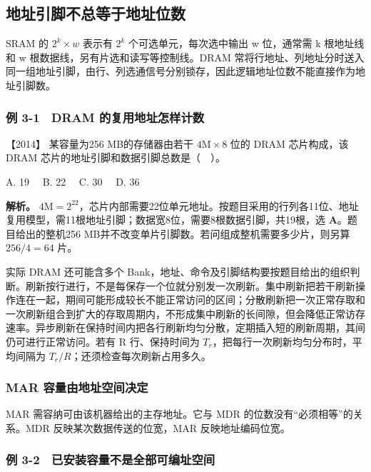 \subsection{地址引脚不总等于地址位数}\label{co-03-03}

SRAM 的 \(2^k\times w\) 表示有 \(2^k\) 个可选单元，每次选中输出 w 位，通常需 k 根地址线和 w 根数据线，另有片选和读写等控制线。DRAM 常将行地址、列地址分时送入同一组地址引脚，由行、列选通信号分别锁存，因此逻辑地址位数不能直接作为地址引脚数。

\subsubsection{例 3-1　DRAM 的复用地址怎样计数}\label{co-ex3-1}

\noindent{}【2014】 某容量为256 MB的存储器由若干 \(4\mathrm M\times8\) 位的 DRAM 芯片构成，该 DRAM 芯片的地址引脚和数据引脚总数是（　）。

A. 19　 B. 22　 C. 30　 D. 36


\textbf{解析。} \(4\mathrm M=2^{22}\)，芯片内部需要22位单元地址。按题目采用的行列各11位、地址复用模型，需11根地址引脚；数据宽8位，需要8根数据引脚，共19根，选 \textbf{A}。题目给出的整机256 MB并不改变单片引脚数。若问组成整机需要多少片，则另算 \(256/4=64\) 片。

实际 DRAM 还可能含多个 Bank，地址、命令及引脚结构要按题目给出的组织判断。刷新按行进行，不是每保存一个位就分别发一次刷新。集中刷新把若干刷新操作连在一起，期间可能形成较长不能正常访问的区间；分散刷新把一次正常存取和一次刷新组合到扩大的存取周期内，不形成集中刷新的长间隙，但会降低正常访存速率。异步刷新在保持时间内把各行刷新均匀分散，定期插入短的刷新周期，其间仍可进行正常访问。若有 R 行、保持时间为 \(T_r\)，把每行一次刷新均匀分布时，平均间隔为 \(T_r/R\)；还须检查每次刷新占用多久。

\subsubsection{MAR 容量由地址空间决定}\label{mar-ux5bb9ux91cfux7531ux5730ux5740ux7a7aux95f4ux51b3ux5b9a}

MAR 需容纳可由该机器给出的主存地址。它与 MDR 的位数没有``必须相等''的关系。MDR 反映某次数据传送的位宽，MAR 反映地址编码位宽。

\subsubsection{例 3-2　已安装容量不是全部可编址空间}\label{co-ex3-2}

